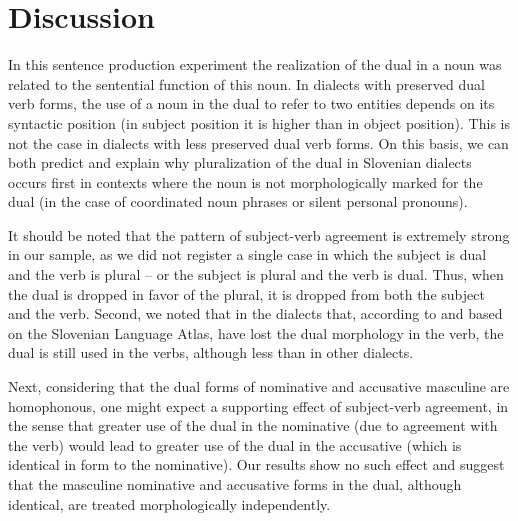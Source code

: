 \documentclass[output=paper,colorlinks,citecolor=brown]{langscibook}
\begin{document}
\section{Discussion}\label{pav:sec:discussion}
In this sentence production experiment the realization of the dual in a noun was related to the sentential function of this noun. In dialects with preserved dual verb forms, the use of a noun in the dual to refer to two entities depends on its syntactic position (in subject position it is higher than in object position). This is not the case in dialects with less preserved dual verb forms. On this basis, we can both predict and explain why pluralization of the dual in Slovenian dialects occurs first in contexts where the noun is not morphologically marked for the dual (in the case of coordinated noun phrases or silent personal pronouns).

It should be noted that the pattern of subject-verb agreement is extremely strong in our sample, as we did not register a single case in which the subject is dual and the verb is plural -- or the subject is plural and the verb is dual. Thus, when the dual is dropped in favor of the plural, it is dropped from both the subject and the verb.
Second, we noted that in the dialects that, according to \citet{Jakop2008} and based on the Slovenian Language Atlas, have lost the dual morphology in the verb, the dual is still used in the verbs, although less than in other dialects.

Next, considering that the dual forms of nominative and accusative masculine are homophonous, one might expect a  supporting effect of subject-verb agreement, in the sense that greater use of the dual in the nominative (due to agreement with the verb) would lead to greater use of the dual in the accusative (which is identical in form to the nominative). Our results show no such effect and suggest that the masculine nominative and accusative forms in the dual, although identical, are treated morphologically independently.
\end{document}
